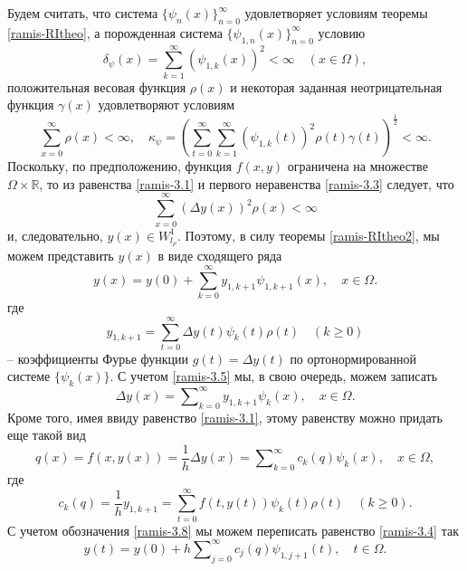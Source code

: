 Будем считать, что  система $\{\psi_{n}(x)\}_{n=0}^\infty$ удовлетворяет условиям теоремы \ref{ramis-RItheo}, а порожденная система $\{\psi_{1,n}(x)\}_{n=0}^\infty$ условию
\begin{equation}\label{ramis-3.2}
\delta_\psi(x)=\sum_{k=1}^{\infty}(\psi_{1,k}(x))^2<\infty\quad (x\in \Omega),
\end{equation}
положительная весовая функция $\rho(x)$ и некоторая заданная неотрицательная функция $\gamma(x)$ удовлетворяют  условиям
\begin{equation}\label{ramis-3.3}
\sum\limits_{x=0}^\infty\rho(x)<\infty,\quad \kappa_{\psi}=\left(\sum_{t=0}^\infty\sum_{k=1}^{\infty}
(\psi_{1,k}(t))^2\rho(t)\gamma(t)\right)^{\frac12}<\infty.
\end{equation}
  Поскольку, по предположению, функция $f(x,y)$ ограничена на множестве $\Omega\times\mathbb{R}$, то из равенства \eqref{ramis-3.1} и первого неравенства \eqref{ramis-3.3} следует, что $$\sum_{x=0}^\infty (\Delta y(x))^2\rho(x)<\infty$$  и, следовательно,   $y(x)\in W^1_{l_\rho}$. Поэтому, в силу теоремы \ref{ramis-RItheo2}, мы можем представить $y(x)$ в виде сходящего ряда
\begin{equation}\label{ramis-3.4}
y(x)=y(0)+\sum\limits_{k=0}^\infty y_{1,k+1}\psi_{1,k+1}(x),\quad x\in \Omega.
\end{equation}
где
  \begin{equation}\label{ramis-3.5}
y_{1,k+1}=\sum_{t=0}^{\infty} \Delta y(t)\psi_{k}(t)\rho(t)\quad(k\ge0)
\end{equation}
-- коэффициенты Фурье функции $g(t)=\Delta y(t)$ по ортонормированной системе $\{\psi_k(x)\}$. С учетом \eqref{ramis-3.5} мы, в свою очередь,  можем записать
\begin{equation}\label{ramis-3.6}
\Delta y(x)=\sum\nolimits_{k=0}^\infty y_{1,k+1}\psi_{k}(x),\quad x\in \Omega.
\end{equation}
Кроме того, имея ввиду равенство \eqref{ramis-3.1}, этому равенству можно придать еще такой вид
\begin{equation}\label{ramis-3.7}
q(x)=f(x,y(x))=\frac{1}{h}\Delta y(x)=\sum\nolimits_{k=0}^\infty c_k(q)\psi_{k}(x),\quad x\in \Omega,
\end{equation}
где
\begin{equation}\label{ramis-3.8}
c_k(q)=\frac{1}{h}y_{1,k+1}=\sum_{t=0}^{\infty} f(t,y(t))\psi_{k}(t)\rho(t)\quad(k\ge0).
\end{equation}
С учетом обозначения \eqref{ramis-3.8} мы можем переписать равенство \eqref{ramis-3.4} так
\begin{equation}\label{ramis-3.9}
y(t)=y(0)+h\sum\nolimits_{j=0}^\infty c_j(q)\psi_{1,j+1}(t),\quad t\in \Omega.
\end{equation}
